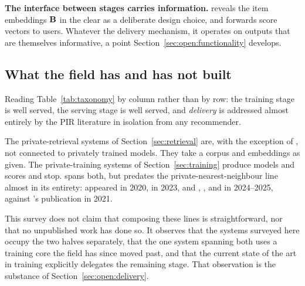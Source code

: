 \textbf{The interface between stages carries information.} \nudgeplain{} reveals the item
embeddings $\mathbf{B}$ in the clear as a deliberate design choice, and forwards score vectors to
users. Whatever the delivery mechanism, it operates on outputs that are themselves informative,
a point Section~\ref{sec:open:functionality} develops.

\subsection{What the field has and has not built}
\label{sec:both:gap}

Reading Table~\ref{tab:taxonomy} by column rather than by row: the training stage is well served,
the serving stage is well served, and \emph{delivery} is addressed almost entirely by the PIR
literature in isolation from any recommender.

The private-retrieval systems of Section~\ref{sec:retrieval} are, with the exception of
\pirsonaplain{}, not connected to privately trained models. They take a corpus and embeddings
as given. The private-training systems of Section~\ref{sec:training} produce models and scores and
stop. \pirsonaplain{} spans both, but predates the private-nearest-neighbour line almost in its
entirety: \sannsplain{} appeared in 2020, \tiptoeplain{} in 2023, and
\pacmannplain{}, \compassplain{}, \pantherplain{} and \wallyplain{} in 2024--2025, against
\pirsonaplain{}'s publication in 2021.

This survey does not claim that composing these lines is straightforward, nor that no unpublished
work has done so. It observes that the systems surveyed here occupy the two halves separately,
that the one system spanning both uses a training core the field has since moved past, and that
the current state of the art in training explicitly delegates the remaining stage. That
observation is the substance of Section~\ref{sec:open:delivery}.
